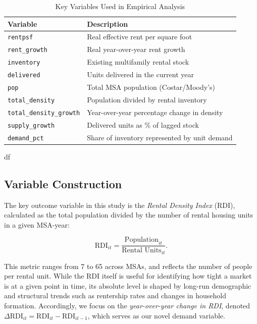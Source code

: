 \documentclass[sn-mathphys-num]{sn-jnl}%
\begin{document}
\begin{table}[H]
	\centering
	\begin{tabular}{l l}
		\toprule
		\textbf{Variable} & \textbf{Description} \\
		\midrule
		\texttt{rentpsf} & Real effective rent per square foot \\
		\texttt{rent\_growth} & Real year-over-year rent growth \\
		\texttt{inventory} & Existing multifamily rental stock \\
		\texttt{delivered} & Units delivered in the current year \\
		\texttt{pop} & Total MSA population (Costar/Moody's) \\
		\texttt{total\_density} & Population divided by rental inventory \\
		\texttt{total\_density\_growth} & Year-over-year percentage change in density \\
		\texttt{supply\_growth} & Delivered units as \% of lagged stock \\
		\texttt{demand\_pct} & Share of inventory represented by unit demand \\
		\bottomrule
	\end{tabular}
	\caption*{Key Variables Used in Empirical Analysis}
	\label{tab:variables}
\end{table}

df\subsection*{Variable Construction}

The key outcome variable in this study is the \textit{Rental Density Index} (RDI), calculated as the total population divided by the number of rental housing units in a given MSA-year:

\begin{equation*}
	\text{RDI}_{it} = \frac{\text{Population}_{it}}{\text{Rental Units}_{it}}.
\end{equation*}
	

This metric ranges from 7 to 65 across MSAs, and reflects the number of people per rental unit. While the RDI itself is useful for identifying how tight a market is at a given point in time, its absolute level is shaped by long-run demographic and structural trends such as rentership rates and changes in household formation. Accordingly, we focus on the \textit{year-over-year change in RDI}, denoted \( \Delta \text{RDI}_{it} = \text{RDI}_{it} - \text{RDI}_{it-1} \), which serves as our novel demand variable.
\end{document}
